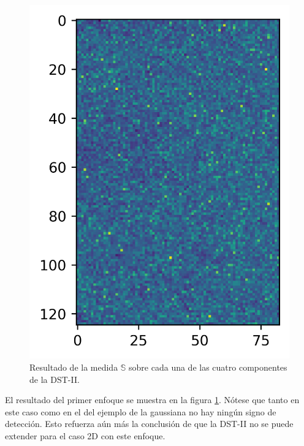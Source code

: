 \begin{figure}
\begin{multicols}{2}
    \includegraphics[width=\linewidth]{Graphics/mm-diagonal.png}\par
\end{multicols}
\caption{Resultado de la medida $\mathbb{S}$ sobre cada una de las cuatro componentes de la DST-II.} \label{fig:example-mm-approach1}
\end{figure}

El resultado del primer enfoque se muestra en la figura \ref{fig:example-mm-approach1}. Nótese que
tanto en este caso como en el
del ejemplo de la gaussiana no hay ningún signo de detección. Esto refuerza aún más la conclusión de que la DST-II no se puede
extender para el caso 2D con este enfoque.

